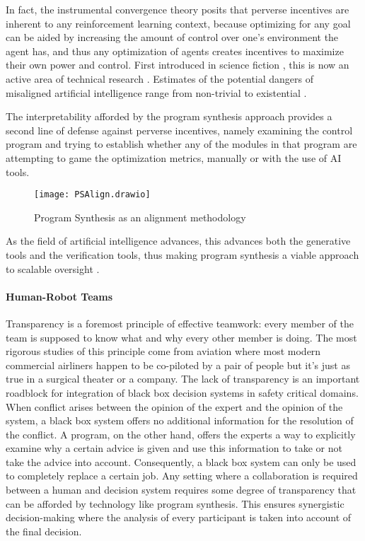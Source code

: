 In fact, the instrumental convergence theory \cite{benson-tilsenFormalizingConvergentInstrumental} posits that perverse incentives are inherent to any reinforcement learning context, because optimizing for any goal can be aided by increasing the amount of control over one's environment the agent has, and thus any optimization of agents creates incentives to maximize their own power and control. 
First introduced in science fiction \cite{clarke2001SpaceOdyssey2016, ellisonHaveNoMouth1967, jonesColossus2019}, this is now an active area of technical research \cite{jiAIAlignmentComprehensive2024}.
Estimates of the potential dangers of misaligned artificial intelligence range from non-trivial to existential \cite{mcleanRisksAssociatedArtificial2023}.

The interpretability afforded by the program synthesis approach provides a second line of defense against perverse incentives, namely examining the control program and trying to establish whether any of the modules in that program are attempting to game the optimization metrics, manually or with the use of AI tools.

\begin{figure}[H]
    \centering
    \texttt{[image: PSAlign.drawio]}
    \caption{Program Synthesis as an alignment methodology}
    \label{fig:ps-as-alignment}
\end{figure}

As the field of artificial intelligence advances, this advances both the generative tools and the verification tools, thus making program synthesis a viable approach to scalable oversight \cite[section 5]{amodeiConcreteProblemsAI2016}.

\paragraph{Human-Robot Teams}

Transparency is a foremost principle of effective teamwork: every member of the team is supposed to know what and why every other member is doing. 
The most rigorous studies of this principle come from aviation where most modern commercial airliners happen to be co-piloted by a pair of people but it's just as true in a surgical theater or a company. 
The lack of transparency is an important roadblock for integration of black box decision systems in safety critical domains. 
When conflict arises between the opinion of the expert and the opinion of the system, a black box system offers no additional information for the resolution of the conflict. 
A program, on the other hand, offers the experts a way to explicitly examine why a certain advice is given and use this information to take or not take the advice into account. 
Consequently, a black box system can only be used to completely replace a certain job.
Any setting where a collaboration is required between a human and decision system requires some degree of transparency that can be afforded by technology like program synthesis. 
This ensures synergistic decision-making where the analysis of every participant is taken into account of the final decision.

